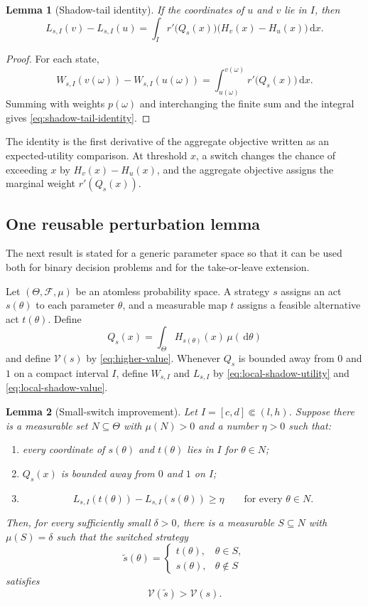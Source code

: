 \documentclass[11pt,a4paper]{article}
\newtheorem{lemma}[lemma]{Lemma}
\theoremstyle{definition}
\newcommand{\V}{\mathcal V}
\newcommand{\dd}{\,\mathrm d}
\begin{document}
\begin{lemma}[Shadow-tail identity]\label{lem:shadow-tail}
If the coordinates of $u$ and $v$ lie in $I$, then
\begin{equation}\label{eq:shadow-tail-identity}
 L_{s,I}(v)-L_{s,I}(u)
 =\int_I r'\bigl(Q_s(x)\bigr)
   \bigl(H_v(x)-H_u(x)\bigr)\dd x.
\end{equation}
\end{lemma}

\begin{proof}
For each state,
\[
 W_{s,I}(v(\omega))-W_{s,I}(u(\omega))
 =\int_{u(\omega)}^{v(\omega)}r'\bigl(Q_s(x)\bigr)\dd x.
\]
Summing with weights $p(\omega)$ and interchanging the finite sum and the
integral gives \eqref{eq:shadow-tail-identity}.
\end{proof}

The identity is the first derivative of the aggregate objective written as an
expected-utility comparison. At threshold $x$, a switch changes the chance of
exceeding $x$ by $H_v(x)-H_u(x)$, and the aggregate objective assigns the
marginal weight $r'(Q_s(x))$.

\subsection{One reusable perturbation lemma}

The next result is stated for a generic parameter space so that it can be used
both for binary decision problems and for the take-or-leave extension.

Let $(\Theta,\mathcal F,\mu)$ be an atomless probability space. A strategy
$s$ assigns an act $s(\theta)$ to each parameter $\theta$, and a measurable
map $t$ assigns a feasible alternative act $t(\theta)$. Define
\[
 Q_s(x)=\int_\Theta H_{s(\theta)}(x)\,\mu(\dd\theta)
\]
and define $\V(s)$ by \eqref{eq:higher-value}. Whenever $Q_s$ is
bounded away from $0$ and $1$ on a compact interval $I$, define
$W_{s,I}$ and $L_{s,I}$ by \eqref{eq:local-shadow-utility} and
\eqref{eq:local-shadow-value}.

\begin{lemma}[Small-switch improvement]\label{lem:small-switch}
Let $I=[c,d]\Subset(l,h)$. Suppose there is a measurable set
$N\subseteq\Theta$ with $\mu(N)>0$ and a number $\eta>0$ such that:
\begin{enumerate}[label=(\roman*)]
 \item every coordinate of $s(\theta)$ and $t(\theta)$ lies in $I$ for
       $\theta\in N$;
 \item $Q_s(x)$ is bounded away from $0$ and $1$ on $I$;
 \item
 \[
  L_{s,I}(t(\theta))-L_{s,I}(s(\theta))\geq\eta
  \qquad\text{for every }\theta\in N.
 \]
\end{enumerate}
Then, for every sufficiently small $\delta>0$, there is a measurable
$S\subseteq N$ with $\mu(S)=\delta$ such that the switched strategy
\[
 \widetilde s(\theta)
 =\begin{cases}
   t(\theta),&\theta\in S,\\
   s(\theta),&\theta\notin S
  \end{cases}
\]
satisfies
\[
 \V(\widetilde s)>\V(s).
\]
\end{lemma}
\end{document}
